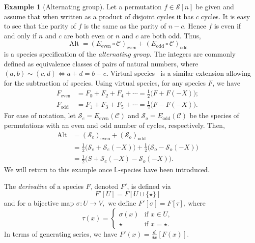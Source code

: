 \documentclass[a4paper, 11pt]{article}
\newcommand{\LL}{\mathbb{L}}
\DeclareMathOperator{\Alt}{Alt}
\newcommand{\Cyc}{\mathcal{C}}
\newcommand{\Sym}{\mathcal{S}}
\newcommand{\Even}[1]{#1_{\mathrm{even}}}
\newcommand{\Odd}[1]{#1_{\mathrm{odd}}}
\theoremstyle{definition}
\newtheorem{example}[theorem]{Example}
\begin{document}
\begin{example}[Alternating group]\label{example: the alternating group}
  Let a permutation $f\in \Sym[n]$ be given and assume that when written
  as a product of disjoint cycles it has $c$ cycles. It is easy to see
  that the parity of $f$ is the same as the parity of $n-c$. Hence
  $f$ is even if and only if $n$ and $c$ are both even or $n$ and $c$
  are both odd. Thus,
  \[
    \Alt =
    \Even{(\Even{E}\circ \Cyc)} +
    \Odd{(\Odd{E}\circ\Cyc)}
  \]
  is a species specification of the \emph{alternating group}.
  The integers are commonly defined as equivalence classes of pairs of
  natural numbers, where $(a,b)\sim (c,d)\Leftrightarrow
  a+d=b+c$. Virtual species~\cite[\S 2.5]{holybook} is a similar extension
  allowing for the subtraction of species.
  Using virtual species, for any species $F$, we have
  \begin{align*}
  \Even{F} & = F_0+F_2+F_4+\cdots = \frac{1}{2}\bigl(F + F(-X)\bigr);\\
  \Odd{F} & = F_1+F_3+F_5+\cdots = \frac{1}{2}\bigl(F - F(-X)\bigr).
  \end{align*}
  For ease of notation, let
  $\Sym_e=\Even{E}(\Cyc)$
  and
  $\Sym_o=\Odd{E}(\Cyc)$
  be the species of permutations with an even and odd number of cycles,
  respectively.  Then,
  \begin{align}
    \Alt
    &= \Even{(\Sym_e)} + \Odd{(\Sym_o)} \nonumber \\[1ex]
    &= \frac{1}{2}\bigl(\Sym_e + \Sym_e(-X)\bigr)
      + \frac{1}{2}\bigl(\Sym_o - \Sym_o(-X)\bigr) \nonumber \\[1ex]
    &= \frac{1}{2}\bigl(S + \Sym_e(-X)-\Sym_o(-X)\bigr).\label{eq:Alt B-species}
  \end{align}
  We will return to this example once $\LL$-species have been introduced.
\end{example}

The \emph{derivative} of a species $F$,
denoted $F'$, is defined via \[F'[U] = F[U \sqcup \{\star\}] \] and for
a bijective map
$\sigma: U \to V, \text{ we define } F'[\sigma] = F[\tau]$, where
\begin{equation*}
  \tau(x) = 
  \begin{cases}
    \sigma(x) & \text{if } x \in U, \\
    \star     & \text{if } x=\star.
  \end{cases}
\end{equation*}
In terms of generating series, we have
$F'(x)=\frac{d}{dx} [F(x)]$.
\end{document}
